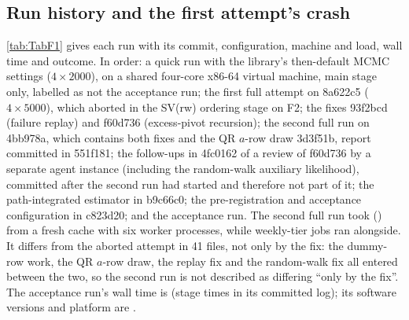 \subsection{Run history and the first attempt's crash}\label{app:cr-history}

\cref{tab:TabF1} gives each run with its commit, configuration, machine and load, wall time
and outcome.
In order: a quick run with the library's then-default MCMC settings ($4\times2000$), on a shared
four-core x86-64 virtual machine, main stage only, labelled as not the acceptance run; the first full
attempt on 8a622c5 ($4\times5000$), which aborted in the SV(rw) ordering stage on F2; the fixes
93f2bcd (failure replay) and f60d736 (excess-pivot recursion); the second full run on 4bb978a, which
contains both fixes and the QR $a$-row draw 3d3f51b, report committed in 551f181; the follow-ups in
4fc0162 of a review of f60d736 by a separate agent instance (including the random-walk auxiliary
likelihood), committed
after the second run had started and therefore not part of it; the path-integrated estimator in
b9c66c0; the pre-registration and acceptance configuration in c823d20; and the acceptance run.
The second full run took  () from a fresh cache with six worker
processes, while weekly-tier jobs ran alongside.
It differs from the aborted attempt in 41 files, not only by the fix: the dummy-row work, the QR
$a$-row draw, the replay fix and the random-walk fix all entered between the two, so the second run
is not described as differing ``only by the fix''.
The acceptance run's wall time is  (stage times in its committed log); its software
versions and platform are . %

